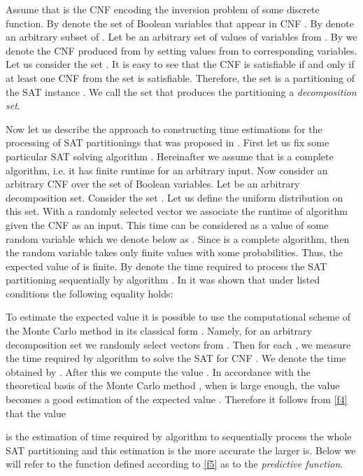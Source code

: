 \documentclass[runningheads,a4paper]{llncs}
\begin{document}
Assume that  is the CNF encoding the inversion problem of some discrete function. By  denote the set of Boolean variables that appear in CNF . By  denote an arbitrary subset of . Let  be an arbitrary set of values of variables from . By  we denote the CNF produced from  by setting values from  to corresponding variables. Let us consider the set . It is easy to see that the CNF  is satisfiable if and only if at least one CNF from the set  is satisfiable. Therefore, the set  is a partitioning of the SAT instance  \cite{Hyvarinen11}. We call the set  that produces the partitioning  a \textit{decomposition set}.

Now let us describe the approach to constructing time estimations for the processing of SAT partitionings that was proposed in \cite{DBLP:journals/corr/SemenovZ13}. First let us fix some particular SAT solving algorithm . Hereinafter we assume that  is a complete algorithm, i.e. it has finite runtime for an arbitrary input. Now consider an arbitrary CNF  over the set  of Boolean variables. Let  be an arbitrary decomposition set. Consider the set . Let us define the uniform distribution on this set. With a randomly selected vector  we associate the runtime of algorithm  given the CNF  as an input. This time can be considered as a value of some random variable which we denote below as . Since  is a complete algorithm, then the random variable  takes only finite values with some probabilities. Thus, the expected value of  is finite. By  denote the time required to process the SAT partitioning  sequentially by algorithm . In \cite{DBLP:journals/corr/SemenovZ13} it was shown that under listed conditions the following equality holds:


To estimate the expected value  it is possible to use the computational scheme of the Monte Carlo method in its classical form \cite{Metropolis49}. Namely, for an arbitrary decomposition set  we randomly select vectors  from . Then for each ,  we measure the time required by algorithm  to solve the SAT for CNF . We denote the time obtained by . After this we compute the value . In accordance with the theoretical basis of the Monte Carlo method \cite{Metropolis49,Kalos:109491}, when  is large enough, the value  becomes a good estimation of the expected value . Therefore it follows from \eqref{f4} that the value

is the estimation of time required by algorithm  to sequentially process the whole SAT partitioning  and this estimation is the more accurate the larger  is. Below we will refer to the function defined according to \eqref{f5} as to the \textit{predictive function}.
\end{document}

